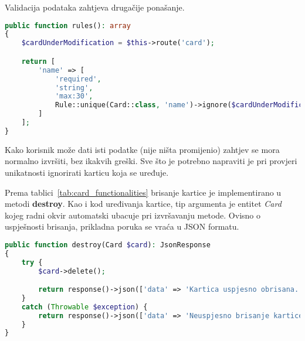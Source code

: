 Validacija podataka zahtjeva drugačije ponašanje.

\begin{lstlisting}[language=PHP]
public function rules(): array
{
    $cardUnderModification = $this->route('card');

    return [
        'name' => [
            'required',
            'string',
            'max:30',
            Rule::unique(Card::class, 'name')->ignore($cardUnderModification->id)
        ]
    ];
}
\end{lstlisting}

Kako korisnik može dati isti podatke (nije ništa promijenio) zahtjev se mora normalno izvršiti, bez ikakvih greški.
Sve što je potrebno napraviti je pri provjeri unikatnosti ignorirati karticu koja se uređuje.

Prema tablici~\ref{tab:card_functionalities} brisanje kartice je implementirano u metodi \textbf{destroy}.
Kao i kod uređivanja kartice, tip argumenta je entitet \textit{Card} kojeg radni okvir automatski ubacuje pri izvršavanju metode.
Ovisno o uspješnosti brisanja, prikladna poruka se vraća u JSON formatu.

\begin{lstlisting}[language=PHP]
public function destroy(Card $card): JsonResponse
{
    try {
        $card->delete();

        return response()->json(['data' => 'Kartica uspjesno obrisana.']);
    }
    catch (Throwable $exception) {
        return response()->json(['data' => 'Neuspjesno brisanje kartice. Pokusajte ponovo!']);
    }
}
\end{lstlisting}
